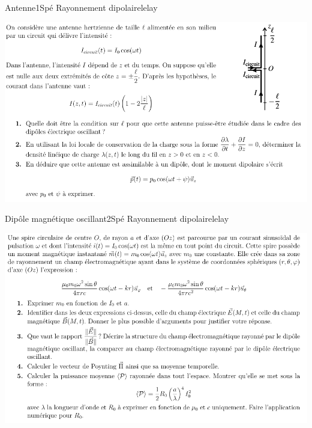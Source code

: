 \begin{exercise}{Antenne}{1}{Spé}
{Rayonnement dipolaire}{lelay}

\includegraphics[width=\textwidth]{electromag/ondesEM/antenne.png}

\end{exercise}


\begin{exercise}{Dipôle magnétique oscillant}{2}{Spé}
{Rayonnement dipolaire}{lelay}

\includegraphics[width=\textwidth]{electromag/ondesEM/rayonnementdipolairespire.png}

\end{exercise}

